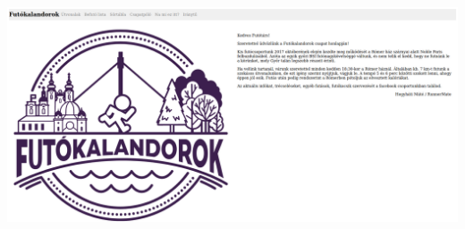 \begin{frame}
  \begin{center}
    \includegraphics[width=.75\textwidth]{futokalandorok1.png}\\
  \end{center}
\end{frame}

